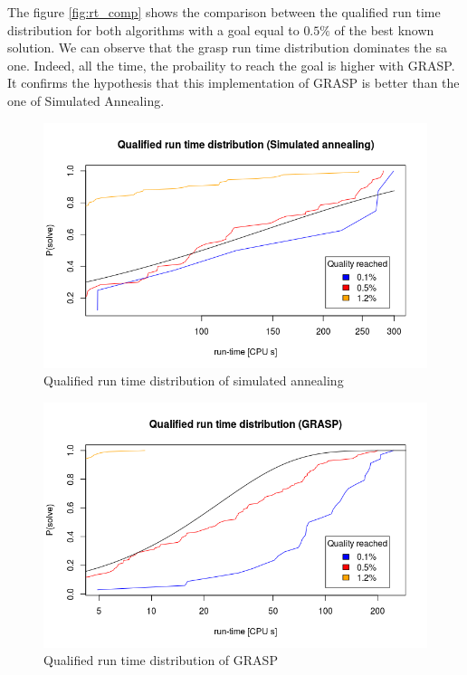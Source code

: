 \documentclass{article}
\begin{document}
The figure \ref{fig:rt_comp} shows the comparison between the qualified run time distribution for both algorithms with a goal equal to $0.5\%$ of the best known solution.
We can observe that the grasp run time distribution dominates the sa one.
Indeed, all the time, the probaility to reach the goal is higher with GRASP.
It confirms the hypothesis that this implementation of GRASP is better than the one of Simulated Annealing.

\begin{figure}
    \centering
        \includegraphics[scale=0.5]{images/rt_sa}
    \caption{Qualified run time distribution of simulated annealing}
    \label{fig:rt_sa}
\end{figure}

\begin{figure}
    \centering
        \includegraphics[scale=0.5]{images/rt_grasp}
    \caption{Qualified run time distribution of GRASP}
    \label{fig:rt_grasp}
\end{figure}
\end{document}

